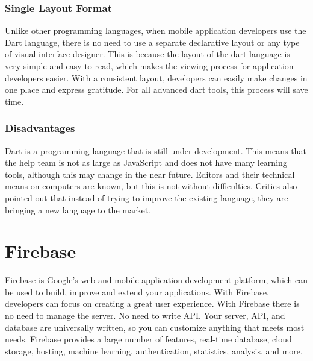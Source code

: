 \subsubsection{Single Layout Format}
Unlike other programming languages, when mobile application developers use the Dart language, there is no need to use a separate declarative layout or any type of visual interface designer. This is because the layout of the dart language is very simple and easy to read, which makes the viewing process for application developers easier. With a consistent layout, developers can easily make changes in one place and express gratitude. For all advanced dart tools, this process will save time.

\subsubsection{Disadvantages}
Dart is a programming language that is still under development. This means that the help team is not as large as JavaScript and does not have many learning tools, although this may change in the near future. Editors and their technical means on computers are known, but this is not without difficulties. Critics also pointed out that instead of trying to improve the existing language, they are bringing a new language to the market.

\section{Firebase}
Firebase is Google's web and mobile application development platform, which can be used to build, improve and extend your applications. With Firebase, developers can focus on creating a great user experience. With Firebase there is no need to manage the server. No need to write API. Your server, API, and database are universally written, so you can customize anything that meets most needs. Firebase provides a large number of features, real-time database, cloud storage, hosting, machine learning, authentication, statistics, analysis, and more.
